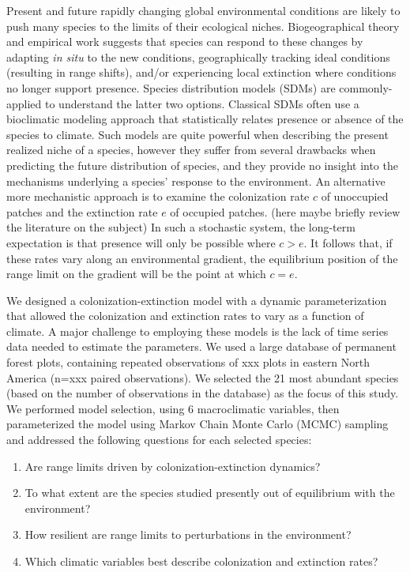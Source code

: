 \documentclass[11pt]{article}
\begin{document}
Present and future rapidly changing global environmental conditions are likely to push many species to the limits of their ecological niches.
Biogeographical theory and empirical work suggests that species can respond to these changes by adapting \emph{in situ} to the new conditions, geographically tracking ideal conditions (resulting in range shifts), and/or experiencing local extinction where conditions no longer support presence.
Species distribution models (SDMs) are commonly-applied to understand the latter two options.
Classical SDMs often use a bioclimatic modeling approach that statistically relates presence or absence of the species to climate.
Such models are quite powerful when describing the present realized niche of a species, however they suffer from several drawbacks when predicting the future distribution of species, and they provide no insight into the mechanisms underlying a species' response to the environment.
An alternative more mechanistic approach is to examine the colonization rate $c$ of unoccupied patches and the extinction rate $e$ of occupied patches.
(here maybe briefly review the literature on the subject)
In such a stochastic system, the long-term expectation is that presence will only be possible where $c > e$.
It follows that, if these rates vary along an environmental gradient, the equilibrium position of the range limit on the gradient will be the point at which $c = e$.

We designed a colonization-extinction model with a dynamic parameterization that allowed the colonization and extinction rates to vary as a function of climate.
A major challenge to employing these models is the lack of time series data needed to estimate the parameters.
We used a large database of permanent forest plots, containing repeated observations of xxx plots in eastern North America (n=xxx paired observations). 
We selected the 21 most abundant species (based on the number of observations in the database) as the focus of this study.
We performed model selection, using 6 macroclimatic variables, then parameterized the model using Markov Chain Monte Carlo (MCMC) sampling and addressed the following questions for each selected species:
\begin{enumerate}
	\item Are range limits driven by colonization-extinction dynamics?
	\item To what extent are the species studied presently out of equilibrium with the environment?
	\item How resilient are range limits to perturbations in the environment?
	\item Which climatic variables best describe colonization and extinction rates?
\end{enumerate}
\end{document}

